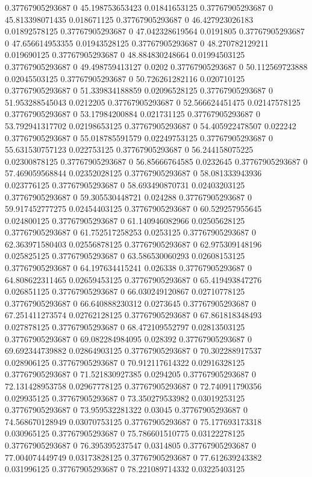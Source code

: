 0.37767905293687 0 45.198753653423 0.01841653125
0.37767905293687 0 45.813398071435 0.018671125
0.37767905293687 0 46.427923026183 0.01892578125
0.37767905293687 0 47.042328619564 0.0191805
0.37767905293687 0 47.656614953355 0.01943528125
0.37767905293687 0 48.270782129211 0.019690125
0.37767905293687 0 48.884830248664 0.01994503125
0.37767905293687 0 49.498759413127 0.0202
0.37767905293687 0 50.112569723888 0.02045503125
0.37767905293687 0 50.726261282116 0.020710125
0.37767905293687 0 51.339834188859 0.02096528125
0.37767905293687 0 51.953288545043 0.0212205
0.37767905293687 0 52.566624451475 0.02147578125
0.37767905293687 0 53.17984200884 0.021731125
0.37767905293687 0 53.792941317702 0.02198653125
0.37767905293687 0 54.405922478507 0.022242
0.37767905293687 0 55.018785591579 0.02249753125
0.37767905293687 0 55.631530757123 0.022753125
0.37767905293687 0 56.244158075225 0.02300878125
0.37767905293687 0 56.85666764585 0.0232645
0.37767905293687 0 57.469059568844 0.02352028125
0.37767905293687 0 58.081333943936 0.023776125
0.37767905293687 0 58.693490870731 0.02403203125
0.37767905293687 0 59.305530448721 0.024288
0.37767905293687 0 59.917452777275 0.02454403125
0.37767905293687 0 60.529257955645 0.024800125
0.37767905293687 0 61.140946082966 0.02505628125
0.37767905293687 0 61.752517258253 0.0253125
0.37767905293687 0 62.363971580403 0.02556878125
0.37767905293687 0 62.975309148196 0.025825125
0.37767905293687 0 63.586530060293 0.02608153125
0.37767905293687 0 64.197634415241 0.026338
0.37767905293687 0 64.808622311465 0.02659453125
0.37767905293687 0 65.419493847276 0.026851125
0.37767905293687 0 66.030249120867 0.02710778125
0.37767905293687 0 66.640888230312 0.0273645
0.37767905293687 0 67.251411273574 0.02762128125
0.37767905293687 0 67.861818348493 0.027878125
0.37767905293687 0 68.472109552797 0.02813503125
0.37767905293687 0 69.082284984095 0.028392
0.37767905293687 0 69.692344739882 0.02864903125
0.37767905293687 0 70.302288917537 0.028906125
0.37767905293687 0 70.912117614322 0.02916328125
0.37767905293687 0 71.521830927385 0.0294205
0.37767905293687 0 72.131428953758 0.02967778125
0.37767905293687 0 72.740911790356 0.029935125
0.37767905293687 0 73.350279533982 0.03019253125
0.37767905293687 0 73.959532281322 0.03045
0.37767905293687 0 74.568670128949 0.03070753125
0.37767905293687 0 75.177693173318 0.030965125
0.37767905293687 0 75.786601510775 0.03122278125
0.37767905293687 0 76.395395237547 0.0314805
0.37767905293687 0 77.004074449749 0.03173828125
0.37767905293687 0 77.612639243382 0.031996125
0.37767905293687 0 78.221089714332 0.03225403125
